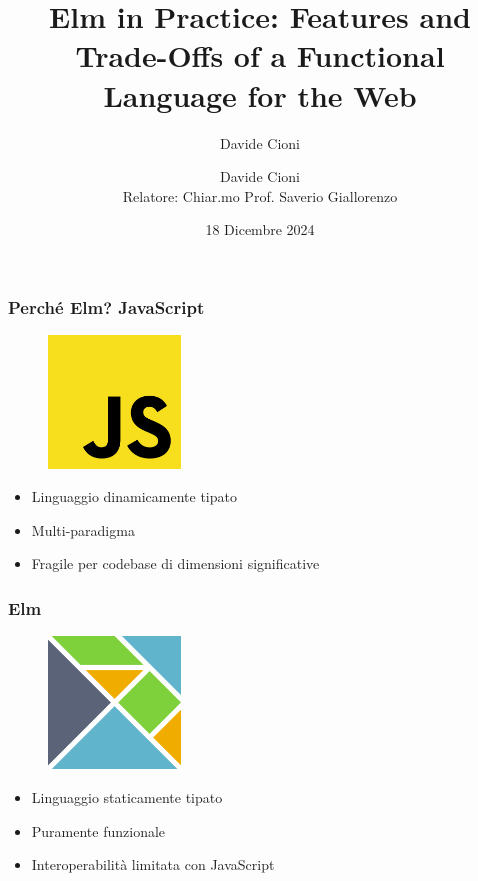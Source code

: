 \documentclass{beamer}
\title{Elm in Practice: Features and Trade-Offs of a Functional Language for the Web}
\author{Davide Cioni}
\author[Davide Cioni]{
    Davide Cioni
    \\{\small Relatore: Chiar.mo Prof. Saverio Giallorenzo}
    }
\institute{Alma Mater Studiorum $\cdot$ Università di Bologna}
\date{18 Dicembre 2024}
\begin{document}
\begin{frame}
  \titlepage
\end{frame}

\begin{frame}
    \frametitle{Perché Elm? JavaScript}
    \begin{figure}
      \centering
      \includegraphics[height=100pt]{assets/js-logo.png}
    \end{figure}
    \begin{itemize}
        \item Linguaggio dinamicamente tipato
        \item Multi-paradigma
        \item Fragile per codebase di dimensioni significative
    \end{itemize}
\end{frame}

\begin{frame}
  \frametitle{Elm}
  \begin{figure}
    \centering
    \includegraphics[height=100pt]{assets/elm-logo.png}
  \end{figure}
  \begin{itemize}
      \item Linguaggio staticamente tipato
      \item Puramente funzionale
      \item Interoperabilità limitata con JavaScript
  \end{itemize}
\end{frame}
\end{document}
